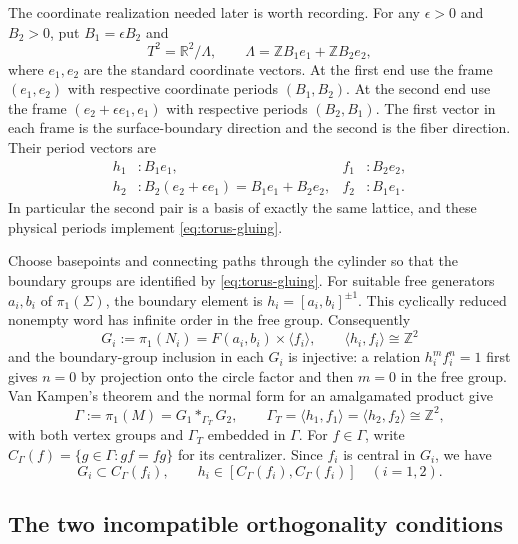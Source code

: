 The coordinate realization needed later is worth recording.  For any
$\epsilon>0$ and $B_2>0$, put $B_1=\epsilon B_2$ and
\[
 T^2=\mathbb R^2/\Lambda,\qquad
 \Lambda=\mathbb Z B_1e_1+\mathbb Z B_2e_2,
\]
where $e_1,e_2$ are the standard coordinate vectors.  At the first end use
the frame $(e_1,e_2)$ with respective coordinate periods $(B_1,B_2)$.
At the second end use the frame $(e_2+\epsilon e_1,e_1)$ with respective
periods $(B_2,B_1)$.  The first vector in each frame is the surface-boundary
direction and the second is the fiber direction.  Their period vectors are
\begin{equation}\label{eq:torus-periods}
 \begin{aligned}
 h_1&: B_1e_1,& f_1&:B_2e_2,\\
 h_2&:B_2(e_2+\epsilon e_1)=B_1e_1+B_2e_2,
 &f_2&:B_1e_1.
 \end{aligned}
\end{equation}
In particular the second pair is a basis of exactly the same lattice,
and these physical periods implement \eqref{eq:torus-gluing}.

Choose basepoints and connecting paths through the cylinder so that the
boundary groups are identified by \eqref{eq:torus-gluing}.  For suitable
free generators $a_i,b_i$ of $\pi_1(\Sigma)$, the boundary element is
$h_i=[a_i,b_i]^{\pm1}$.  This cyclically reduced nonempty word has infinite
order in the free group.  Consequently
\[
 G_i:=\pi_1(N_i)=F(a_i,b_i)\times\langle f_i\rangle,
 \qquad
 \langle h_i,f_i\rangle\cong\mathbb Z^2
\]
and the boundary-group inclusion in each $G_i$ is injective: a relation
$h_i^m f_i^n=1$ first gives $n=0$ by projection onto the circle factor
and then $m=0$ in the free group.  Van Kampen's theorem and the normal form
for an amalgamated product give
\begin{equation}\label{eq:amalgam}
 \Gamma:=\pi_1(M)=G_1*_{\Gamma_T}G_2,
 \qquad \Gamma_T=\langle h_1,f_1\rangle=\langle h_2,f_2\rangle\cong\mathbb Z^2,
\end{equation}
with both vertex groups and $\Gamma_T$ embedded in $\Gamma$.
For $f\in\Gamma$, write
$C_\Gamma(f)=\{g\in\Gamma:gf=fg\}$ for its centralizer.  Since $f_i$ is
central in $G_i$, we have
\begin{equation}\label{eq:boundary-commutators}
 G_i\subset C_\Gamma(f_i),\qquad
 h_i\in[C_\Gamma(f_i),C_\Gamma(f_i)]\quad(i=1,2).
\end{equation}

\subsection{The two incompatible orthogonality conditions}

